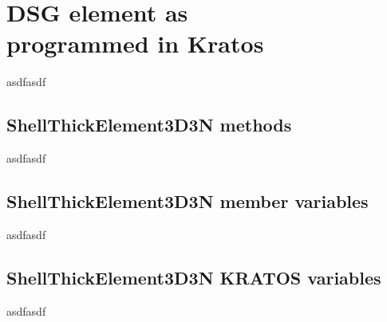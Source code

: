
\chapter[DSG element as programmed in Kratos]{DSG element as \\programmed in Kratos}
\label{app:DSG element as programmed in Kratos}
\renewcommand{\Thema}{DSG element as programmed in Kratos}

asdfasdf

\section{ShellThickElement3D3N methods}
asdfasdf

\section{ShellThickElement3D3N member variables}
asdfasdf

\section{ShellThickElement3D3N KRATOS variables}
asdfasdf